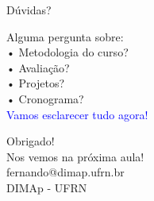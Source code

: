 \documentclass[10pt]{beamer}
\begin{document}
\begin{frame}{Dúvidas?}
	\begin{center}
		{\Large Alguma pergunta sobre:}\\
		\bigskip
		• Metodologia do curso?\\
		• Avaliação?\\
		• Projetos?\\
		• Cronograma?\\
		\bigskip
		\bigskip
		{\Large \textcolor{blue}{Vamos esclarecer tudo agora!}}
	\end{center}
\end{frame}

\begin{frame}
	\begin{center}
		{\Huge Obrigado!}\\
		\bigskip
		{\Large Nos vemos na próxima aula!}\\
		\bigskip
		\bigskip
		{\large fernando@dimap.ufrn.br}\\
		{\large DIMAp - UFRN}
	\end{center}
\end{frame}
\end{document}

